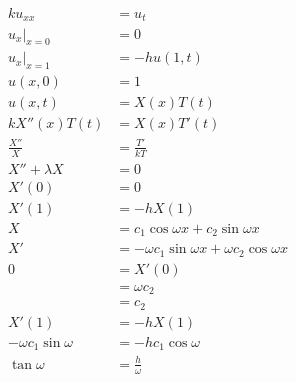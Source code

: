 \documentclass{article}
\begin{document}
\begin{align*}
  k u_{x x}               & = u_t                                                                     \\
  u_x|_{x = 0}            & = 0                                                                       \\
  u_x|_{x = 1}            & = -h u(1, t)                                                              \\
  u(x, 0)                 & = 1                                                                       \\
  u(x, t)                 & = X(x) T(t)                                                               \\
  k X''(x) T(t)           & = X(x) T'(t)                                                              \\
  \frac{X''}{X}           & = \frac{T'}{k T}                                                          \\
  X'' + \lambda X         & = 0                                                                       \\
  X'(0)                   & = 0                                                                       \\
  X'(1)                   & = -h X(1)                                                                 \\
  X                       & = c_1 \cos \omega x + c_2 \sin \omega x                                   \\
  X'                      & = -\omega c_1 \sin \omega x + \omega c_2 \cos \omega x                    \\
  0                       & = X'(0)                                                                   \\
                          & = \omega c_2                                                              \\
                          & = c_2                                                                     \\
  X'(1)                   & = -h X(1)                                                                 \\
  -\omega c_1 \sin \omega & = -h c_1 \cos \omega                                                      \\
  \tan \omega             & = \frac{h}{\omega}                                                        \\

\end{align*}
\end{document}
